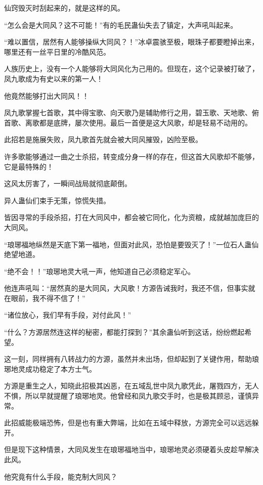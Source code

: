 \begin{this_body}
仙窍毁灭时刮起来的，就是这样的风。

“怎么会是大同风？这不可能！”有的毛民蛊仙失去了镇定，大声吼叫起来。

“难以置信，居然有人能够操纵大同风？！”冰卓震骇至极，眼珠子都要瞪掉出来，哪里还有一丝平日里的冷酷风范。

人族历史上，没有一个人能够将大同风化为己用的。但现在，这个记录被打破了，凤九歌成为有史以来的第一人！

他竟然能够打出大同风！！

凤九歌掌握七首歌，其中得宝歌、向天歌乃是辅助修行之用，碧玉歌、天地歌、俯首歌、离歌都是底牌，屡次使用。最后一首便是这大风歌，却是轻易不动用的。

此招若是施展失败，凤九歌首先就会被大同风摧毁，凶险至极。

许多歌能够通过一曲之士杀招，转变成分身一样的存在，但这首大风歌却不能够，它是最特殊的！

这风太厉害了，一瞬间战局就彻底颠倒。

异人蛊仙们束手无策，惊慌失措。

皆因寻常的手段杀招，打在大同风中，都会被它同化，化为资粮，成就越加庞巨的大同风。

“琅琊福地纵然是天底下第一福地，但面对此风，恐怕是要毁灭了！”一位石人蛊仙绝望地道。

“绝不会！！”琅琊地灵大吼一声，他知道自己必须稳定军心。

他连声吼叫：“居然真的是大同风，大风歌！方源告诫我时，我还不信，但事实就在眼前，我不得不信了！”

“诸位放心，我们早有手段，对付此风！”

“什么？方源居然连这样的秘密，都能打探到？”其余蛊仙听到这话，纷纷燃起希望。

这一刻，同样拥有八转战力的方源，虽然并未出场，但却起到了关键作用，帮助琅琊地灵成功稳定了本方士气。

方源是重生之人，知晓此招极其凶恶，在五域乱世中凤九歌凭此，屠戮四方，无人不惧，所以早就提醒了琅琊地灵。他曾经和凤九歌交手时，也是极其顾忌，谨慎异常。

此招威能极端恐怖，但是也有重大弊端，比如在五域中释放，方源完全可以远远躲开。

但是现下这种情景，大同风发生在琅琊福地当中，琅琊地灵必须硬着头皮趁早解决此风。

他究竟有什么手段，能克制大同风？

\end{this_body}

